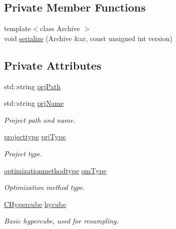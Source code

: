 \subsection*{Private Member Functions}
\begin{DoxyCompactItemize}
\item 
{\footnotesize template$<$class Archive $>$ }\\void \hyperlink{class_go_s_u_m_1_1_c_container_adf9cfa4d07d21eafbd8f3c04c90b7f1f}{serialize} (Archive \&ar, const unsigned int version)
\end{DoxyCompactItemize}
\subsection*{Private Attributes}
\begin{DoxyCompactItemize}
\item 
std\-::string \hyperlink{class_go_s_u_m_1_1_c_container_a6aa9dc492a21cf8966df5d90817c93b6}{prj\-Path}
\item 
std\-::string \hyperlink{class_go_s_u_m_1_1_c_container_a14823f77454a7bcbba182c30f6ae0735}{prj\-Name}
\begin{DoxyCompactList}\small\item\em Project path and name. \end{DoxyCompactList}\item 
\hyperlink{class_go_s_u_m_1_1_c_container_ab98aa1c7c84b62772c0f107a997b5076}{projecttype} \hyperlink{class_go_s_u_m_1_1_c_container_a35c156d40a3deb898fec8b4fe0d7639a}{prj\-Type}
\begin{DoxyCompactList}\small\item\em Project type. \end{DoxyCompactList}\item 
\hyperlink{class_go_s_u_m_1_1_c_container_a1bcf4ef46bf23d5c838e8a5c20953e82}{optimizationmethodtype} \hyperlink{class_go_s_u_m_1_1_c_container_a1e9582618d0ba3ef25fda4359092ee4d}{om\-Type}
\begin{DoxyCompactList}\small\item\em Optimization method type. \end{DoxyCompactList}\item 
\hyperlink{class_go_s_u_m_1_1_c_hypercube}{C\-Hypercube} \hyperlink{class_go_s_u_m_1_1_c_container_a14f86f3146dee751a86ec07a2979790d}{hycube}
\begin{DoxyCompactList}\small\item\em Basic hypercube, used for resampling. \end{DoxyCompactList}\item 

\end{DoxyCompactItemize}
